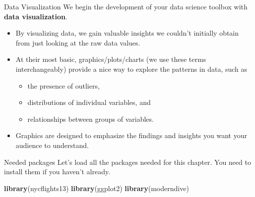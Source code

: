 \documentclass[
  ignorenonframetext,
]{beamer}
\newenvironment{Shaded}{\begin{snugshade}}{\end{snugshade}}
\newcommand{\FunctionTok}[1]{\textcolor[rgb]{0.13,0.29,0.53}{\textbf{#1}}}
\newcommand{\NormalTok}[1]{#1}
\providecommand{\tightlist}{%
  \setlength{\itemsep}{0pt}\setlength{\parskip}{0pt}}
\begin{document}
\begin{frame}{Data Visualization}
\label{data-visualization-1}
We begin the development of your data science toolbox with \textbf{data
visualization}.

\begin{itemize}
\item
  By visualizing data, we gain valuable insights we couldn't initially
  obtain from just looking at the raw data values.
\item
  At their most basic, graphics/plots/charts (we use these terms
  interchangeably) provide a nice way to explore the patterns in data,
  such as

  \begin{itemize}
  \tightlist
  \item
    the presence of outliers,
  \item
    distributions of individual variables, and
  \item
    relationships between groups of variables.
  \end{itemize}
\item
  Graphics are designed to emphasize the findings and insights you want
  your audience to understand.
\end{itemize}
\end{frame}

\begin{frame}[fragile]{Needed packages}
\label{needed-packages}
Let's load all the packages needed for this chapter. You need to install
them if you haven't already.

\small

\begin{Shaded}
\begin{Highlighting}[]
\FunctionTok{library}\NormalTok{(nycflights13)}
\FunctionTok{library}\NormalTok{(ggplot2)}
\FunctionTok{library}\NormalTok{(moderndive)}
\end{Highlighting}
\end{Shaded}

\normalsize
\end{frame}
\end{document}
